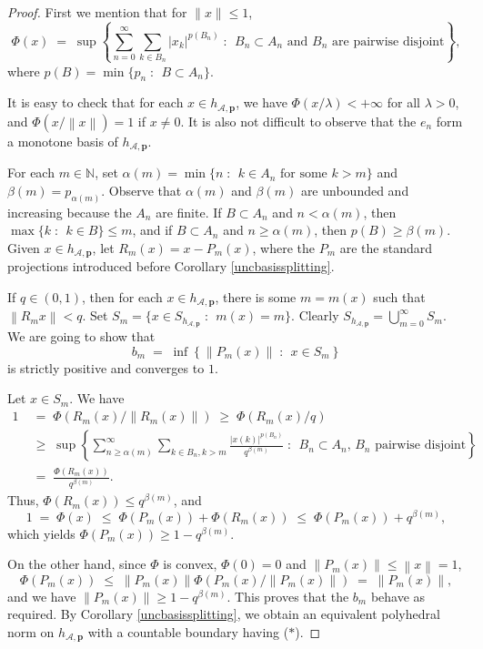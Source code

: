 \documentclass[12pt,a4paper]{amsart}
\theoremstyle{definition}
\theoremstyle{remark}
\newcommand{\dset}[2]{\left\{{#1} \;:\;\, {#2}\right\}}
\newcommand{\n}[1]{\ensuremath{\left\|{#1}\right\|}}
\newcommand{\N}{\mathbb{N}}
\newcommand{\set}[2]{\{{#1} \;:\;\, {#2}\}}
\newcommand{\st}{($*$)}
\begin{document}
\begin{proof}
First we mention that for $\|x\|\leq 1$, 
\[
\Phi(x)\;=\;\sup\dset{\sum_{n=0}^{\infty} \sum_{k\in B_n} |x_k|^{p(B_n)}}{B_n\subset A_n \text{ and } B_n \text{ are pairwise disjoint}},
\]
where  $p(B)=\min\set{p_n}{B \subset A_n}$.

It is easy to check that for each $x\in h_{\mathcal{A},\mathbf{p}}$,
we have $\Phi(x/\lambda)<+\infty$ for all $\lambda >0$, and $\Phi(x/\n{x})=1$
if $x\neq 0$. It is also not difficult to observe that the $e_n$
form a monotone basis of $h_{\mathcal{A},\mathbf{p}}$.

For each $m\in \N$, set $\alpha(m) = \min\set{n}{k\in A_n\text{ for some }k>m}$
and $\beta(m) = p_{\alpha(m)}$. Observe that $\alpha(m)$ and $\beta(m)$
are unbounded and increasing because the $A_n$ are finite.
If $B\subset A_n$ and $n<\alpha(m)$, then $\max\set{k}{k \in B}\leq m$,
and if $B\subset A_n$ and $n\geq\alpha(m)$, then $p(B)\geq \beta(m)$.
Given $x\in h_{\mathcal{A},\mathbf{p}}$, let $R_m(x)= x-P_m(x)$, where the $P_m$
are the standard projections introduced before Corollary \ref{uncbasissplitting}.

If $q\in (0,1)$, then for each $x \in h_{\mathcal{A},\mathbf{p}}$, there
is some $m=m(x)$ such that $\n{R_m x} < q$. Set $S_m =
\set{x\in S_{h_{\mathcal{A},\mathbf{p}}}}{m(x)=m}$.
Clearly $S_{h_{\mathcal{A},\mathbf{p}}}=\bigcup_{m=0}^{\infty}
S_m$. We are going to show that
\[
b_m \;=\; \inf\dset{\n{P_m(x)}}{x \in S_m}
\]
is strictly positive and converges to $1$.

Let $x \in S_m$. We have
\begin{align*}
1 &\;=\; \Phi(R_m(x)/ \n{R_m(x)}) \;\geq\; \Phi(R_m(x)/ q) \\
&\;\geq\; \sup\dset{\sum_{n\geq \alpha(m)}^{\infty}
\sum_{k\in B_n, k>m} \frac{|x(k)|^{p(B_n)}}{q^{\beta(m)}}}
{B_n\subset A_n,\, B_n \text{ pairwise disjoint}} \\
&\;=\; \frac{\Phi(R_m(x))}{q^{\beta(m)}}.
\end{align*}
Thus, $\Phi(R_m(x)) \leq q^{\beta(m)}$, and
\[
1 \;=\; \Phi(x) \;\leq\; \Phi(P_m(x))+\Phi(R_m(x)) \;\leq\;
\Phi(P_m(x)) + q^{\beta(m)},
\]
which yields $\Phi(P_m(x)) \geq 1-q^{\beta(m)}$.

On the other hand, since $\Phi$ is convex, $\Phi(0)=0$ and
$\n{P_m(x)} \leq \n{x} = 1$,
\[
\Phi(P_m(x)) \;\leq\; \n{P_m(x)} \Phi(P_m(x) /\n{P_m(x)}) \;=\; \n{P_m(x)},
\]
and we have $\|P_m(x)\| \geq 1- q^{\beta(m)}$. This proves that
the $b_m$ behave as required. By Corollary \ref{uncbasissplitting},
we obtain an equivalent polyhedral norm on $h_{\mathcal{A},\mathbf{p}}$
with a countable boundary having {\st}.
\end{proof}
\end{document}
